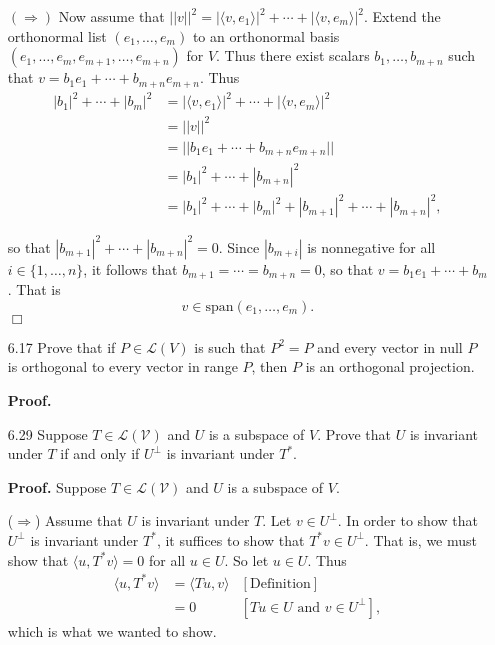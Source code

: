 \documentclass[9pt]{article}
\newcommand{\qed}{\hfill \ensuremath{\Box}}
\newcommand{\cyc}[1]{\langle #1 \rangle}
\begin{document}
\begin{enumerate}
      $(\Rightarrow)$ Now assume that
      $||v||^2 = |\cyc{v, e_1}|^2 + \cdots + |\cyc{v, e_m}|^2$. Extend the
      orthonormal list $(e_1, \ldots, e_m)$ to an orthonormal basis
      $(e_1, \ldots, e_m, e_{m+1}, \ldots, e_{m+n})$ for $V$. Thus there exist
      scalars $b_1, \ldots, b_{m+n}$ such that
      $v = b_1e_1 + \cdots + b_{m+n}e_{m+n}$. Thus
      \begin{align*}
         |b_1|^2 + \cdots + |b_m|^2 &=
         |\cyc{v, e_1}|^2 + \cdots + |\cyc{v, e_m}|^2 \\
            &= ||v||^2 \\
            &= ||b_1e_1 + \cdots + b_{m+n}e_{m+n}|| \\
            &= |b_1|^2 + \cdots + |b_{m+n}|^2 \\
            &= |b_1|^2 + \cdots + |b_m|^2 +
               |b_{m+1}|^2 + \cdots + |b_{m+n}|^2,
      \end{align*}
      
      so that $|b_{m+1}|^2 + \cdots + |b_{m+n}|^2 = 0$. Since
      $|b_{m+i}|$ is nonnegative for all $i \in \{1, \ldots, n\}$, it
      follows that $b_{m+1} = \cdots =  b_{m+n} = 0$, so
      that $v = b_1e_1 + \cdots + b_m$. That is
      $$v \in \text{span}(e_1, \ldots, e_m).$$ \qed
   \item[6.17] Prove that if $P \in \mathcal{L}(V)$ is such that $P^2 = P$ and
               every vector in null $P$ is orthogonal to every vector in range
               $P$, then $P$ is an orthogonal projection.
               
      \textbf{Proof.}
   \item[6.29] Suppose $T \in \mathcal{L(V)}$ and $U$ is a subspace of $V$.
               Prove that $U$ is invariant under $T$ if and only if $U^\perp$
               is invariant under $T^*$.
               
      \textbf{Proof.} Suppose $T \in \mathcal{L(V)}$ and $U$ is a subspace of
      $V$. 
      
      ($\Rightarrow$) Assume that $U$ is invariant under $T$. Let
      $v \in U^\perp$. In order to show that $U^\perp$ is invariant under
      $T^*$, it suffices to show that $T^*v \in U^\perp$. That is, we must show
      that $\cyc{u, T^*v} = 0$ for all $u \in U$. So let $u \in U$. Thus
      \begin{align*}
         \cyc{u, T^*v} &= \cyc{Tu, v} &[\text{Definition}] \\
          &= 0 &[Tu \in U \text{ and } v \in U^\perp],
      \end{align*}
      which is what we wanted to show.
      

\end{enumerate}
\end{document}
